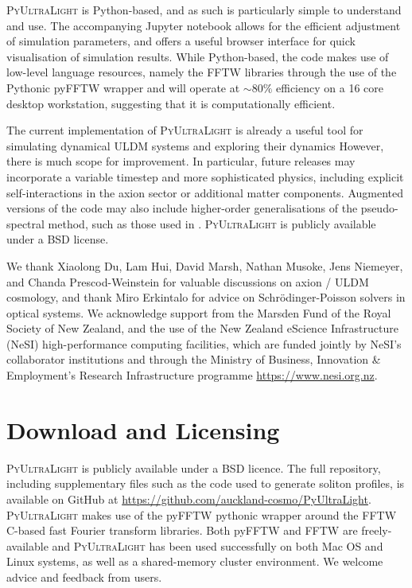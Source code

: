 \documentclass[a4paper,11pt]{article}
\newcommand{\PyUltraLight}{\textsc{PyUltraLight}\xspace}
\begin{document}
\PyUltraLight is Python-based, and as such is particularly simple to understand and use. The accompanying Jupyter notebook allows for the efficient adjustment of simulation parameters, and offers a useful browser interface for quick visualisation of simulation results. While Python-based, the code makes use of low-level language resources, namely the FFTW libraries through the use of the Pythonic pyFFTW wrapper and will operate at $\sim 80\%$ efficiency on a 16 core desktop workstation, suggesting that it is computationally efficient. 

The current implementation of \PyUltraLight is already a useful tool for simulating dynamical ULDM systems and exploring their dynamics However, there is much scope for  improvement. In particular, future releases may incorporate a variable timestep and more sophisticated physics, including explicit self-interactions in the axion sector or additional matter components. Augmented versions of the code may also include higher-order generalisations of the pseudo-spectral method, such as those used in \cite{Levkov:2018kau}. \PyUltraLight is publicly available under a BSD license. 

\acknowledgments

We thank Xiaolong Du, Lam Hui, David Marsh, Nathan Musoke, Jens Niemeyer, and Chanda Prescod-Weinstein for valuable discussions on axion / ULDM cosmology, and thank Miro Erkintalo for advice on Schr{\"o}dinger-Poisson solvers  in optical systems.  We acknowledge support from the Marsden Fund of the Royal Society of New Zealand, and  the use of the New Zealand eScience Infrastructure (NeSI) high-performance computing facilities, which are funded jointly by NeSI's collaborator institutions and through the Ministry of Business, Innovation \& Employment's Research Infrastructure programme \url{https://www.nesi.org.nz}. 


\appendix
\section{Download and Licensing}

\PyUltraLight is publicly available under a BSD licence. The full repository, including supplementary files such as the code used to generate soliton profiles, is available on GitHub at {\url{https://github.com/auckland-cosmo/PyUltraLight}}. \PyUltraLight makes use of the pyFFTW pythonic wrapper around the FFTW C-based fast Fourier transform libraries. Both pyFFTW and FFTW are freely-available and \PyUltraLight has been used successfully on both Mac OS and Linux systems, as well as a shared-memory cluster environment. We welcome advice and feedback from users. 
\end{document}
